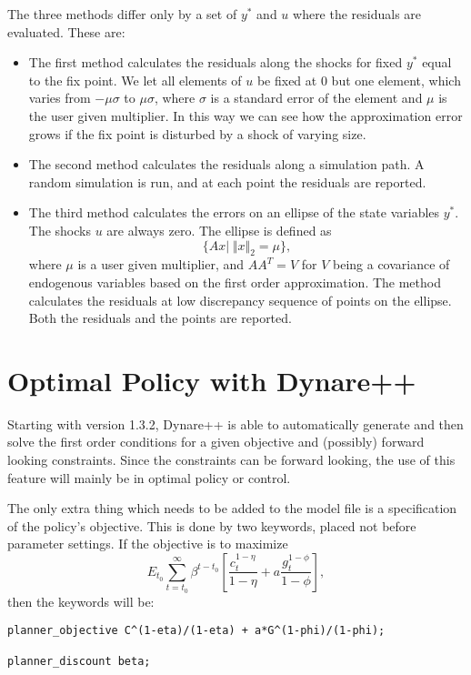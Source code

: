 \documentclass[10pt]{article}
\begin{document}
The three methods differ only by a set of $y^*$ and $u$ where the
residuals are evaluated. These are:
\begin{itemize}
\item The first method calculates the residuals along the shocks for
fixed $y^*$ equal to the fix point. We let all elements of $u$ be
fixed at $0$ but one element, which varies from $-\mu\sigma$ to
$\mu\sigma$, where $\sigma$ is a standard error of the element and
$\mu$ is the user given multiplier. In this way we can see how the
approximation error grows if the fix point is disturbed by a shock of
varying size.
\item The second method calculates the residuals along a simulation
path. A random simulation is run, and at each point the residuals are
reported.
\item The third method calculates the errors on an ellipse of the
state variables $y^*$. The shocks $u$ are always zero. The ellipse is
defined as
\[\{Ax|\; \Vert x\Vert_2=\mu\},\]
where $\mu$ is a user given multiplier, and $AA^T=V$ for $V$ being a
covariance of endogenous variables based on the first order
approximation. The method calculates the residuals at low discrepancy
sequence of points on the ellipse. Both the residuals and the points
are reported.
\end{itemize}

\section{Optimal Policy with Dynare++}
\label{optim}

Starting with version 1.3.2, Dynare++ is able to automatically
generate and then solve the first order conditions for a given
objective and (possibly) forward looking constraints. Since the
constraints can be forward looking, the use of this feature will
mainly be in optimal policy or control.

The only extra thing which needs to be added to the model file is a
specification of the policy's objective. This is done by two keywords,
placed not before parameter settings. If the objective is to maximize
$$E_{t_0}\sum_{t=t_0}^\infty\beta^{t-t_0}\left[\frac{c_t^{1-\eta}}{1-\eta}+
a\frac{g_t^{1-\phi}}{1-\phi}\right],$$
then the keywords will be:
{\small
\begin{verbatim}
planner_objective C^(1-eta)/(1-eta) + a*G^(1-phi)/(1-phi);

planner_discount beta;
\end{verbatim}
}
\end{document}

